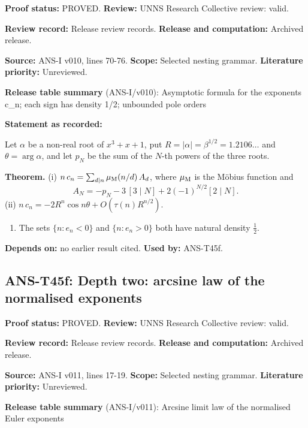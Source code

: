 \documentclass[
  11pt,
]{article}
\providecommand{\tightlist}{%
  \setlength{\itemsep}{0pt}\setlength{\parskip}{0pt}}
\begin{document}
\textbf{Proof status:} PROVED. \textbf{Review:} UNNS Research Collective
review: valid.

\textbf{Review record:} Release review records. \textbf{Release and
computation:} Archived release.

\textbf{Source:} ANS-I v010, lines 70-76. \textbf{Scope:} Selected
nesting grammar. \textbf{Literature priority:} Unreviewed.

\textbf{Release table summary} (ANS-I/v010): Asymptotic formula for the
exponents c\_n; each sign has density 1/2; unbounded pole orders

\textbf{Statement as recorded:}

Let \(\alpha\) be a non-real root of \(x^3+x+1\), put
\(R=|\alpha|=\beta^{1/2}=1.2106\ldots\) and \(\theta=\arg\alpha\), and
let \(p_N\) be the sum of the \(N\)-th powers of the three roots.

\textbf{Theorem.} (i) \(n\,c_n=\sum_{d\mid n}\mu_{\rm M}(n/d)\,A_d\),
where \(\mu_{\rm M}\) is the Möbius function and
\[A_N=-p_N-3\,[3\mid N]+2(-1)^{N/2}[2\mid N].\] (ii)
\(n\,c_n=-2R^n\cos n\theta+O(\tau(n)R^{n/2})\).

\begin{enumerate}
\def\labelenumi{(\roman{enumi})}
\setcounter{enumi}{2}
\tightlist
\item
  The sets \(\{n:e_n<0\}\) and \(\{n:e_n>0\}\) both have natural density
  \(\tfrac12\).
\end{enumerate}

\textbf{Depends on:} no earlier result cited. \textbf{Used by:}
ANS-T45f.

\hypertarget{ans-t45f-depth-two-arcsine-law-of-the-normalised-exponents}{%
\subsection{ANS-T45f: Depth two: arcsine law of the normalised
exponents}\label{ans-t45f-depth-two-arcsine-law-of-the-normalised-exponents}}

\textbf{Proof status:} PROVED. \textbf{Review:} UNNS Research Collective
review: valid.

\textbf{Review record:} Release review records. \textbf{Release and
computation:} Archived release.

\textbf{Source:} ANS-I v011, lines 17-19. \textbf{Scope:} Selected
nesting grammar. \textbf{Literature priority:} Unreviewed.

\textbf{Release table summary} (ANS-I/v011): Arcsine limit law of the
normalised Euler exponents
\end{document}
